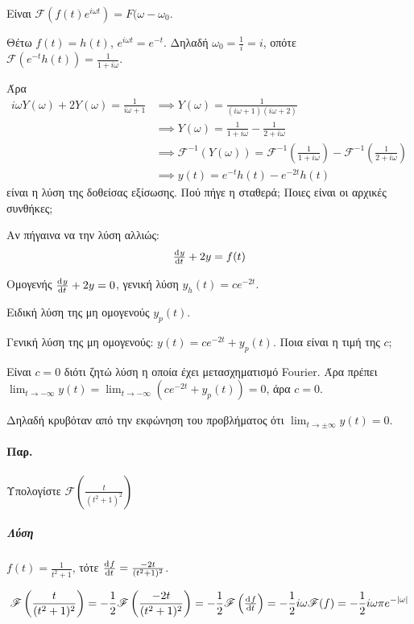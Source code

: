 \documentclass[11pt,a4paper,titlepage,draft]{article}
\begin{document}
Είναι \(\mathscr{F}\left(f(t)e^{i\omega t}\right) = F(\omega-\omega_0\).

Θέτω \(f(t)=h(t)\), \(e^{i\omega t}=e^{-t}\). Δηλαδή \(\omega_0=\frac{1}{i}=i\), οπότε \(\mathscr{F}(e^{-t}h(t)) = \frac{1}{1+i\omega}\).

Άρα
\begin{align*}
i\omega Y(\omega)+2Y(\omega)=\frac{1}{i\omega+1} &\implies
Y(\omega) = \frac{1}{(i\omega+1)(i\omega+2)} \\ &\implies
Y(\omega) = \frac{1}{1+i\omega}-\frac{1}{2+i\omega}
\\ &\implies
\mathscr{F}^{-1}\left(Y(\omega)\right)=\mathscr{F}^{-1}\left(\frac{1}{1+i\omega}\right)
- \mathscr{F}^{-1}\left(\frac{1}{2+i\omega}\right)
\\ &\implies 
\boxed{
y(t)=e^{-t}h(t)-e^{-2t}h(t)
}
\end{align*}
είναι η λύση της δοθείσας εξίσωσης. Πού πήγε η σταθερά; Ποιες είναι οι αρχικές συνθήκες;

Αν πήγαινα να την λύση αλλιώς:
\begin{gather*}
\od{y}{t}+2y=f(t)
\end{gather*}

Ομογενής \(\od{y}{t} +2y=0\), γενική λύση \(y_h(t)=ce^{-2t}\).

Ειδική λύση της μη ομογενούς \(y_p(t)\).

Γενική λύση της μη ομογενούς: \(\boxed{y(t)=ce^{-2t}+y_p(t)}\). Ποια είναι η τιμή της \(c\);

Είναι \(c=0\) διότι ζητώ λύση η οποία έχει μετασχηματισμό Fourier. Άρα πρέπει \(
\lim_{t\to -\infty} y(t)=\lim_{t\to -\infty} \left( ce^{-2t}+y_p(t) \right) = 0
\), άρα \(c=0\).

Δηλαδή κρυβόταν από την εκφώνηση του προβλήματος ότι \(\lim_{t\to \pm\infty} y(t)=0\).

\paragraph{Παρ.}
Υπολογίστε \(
\mathscr{F}\left(
\frac{t}{(t^2+1)^2}
\right)
\)
\subparagraph{Λύση}
\(f(t) = \frac{1}{t^2+1}\), τότε \(\od{f}{t} = \frac{-2t}{(t^2+1)^2}\).

\begin{align*}
\mathscr{F}\left(
\frac{t}{(t^2+1)^2}
\right) = -\frac{1}{2} \mathscr{F}\left(
\frac{-2t}{(t^2+1)^2}
\right) = -\frac{1}{2} \mathscr{F}\left(
\od{f}{t}\right) = -\frac{1}{2}i\omega\mathscr{F}(f)=-\frac{1}{2}i\omega\pi e^{-|\omega|}
\end{align*}
\end{document}
